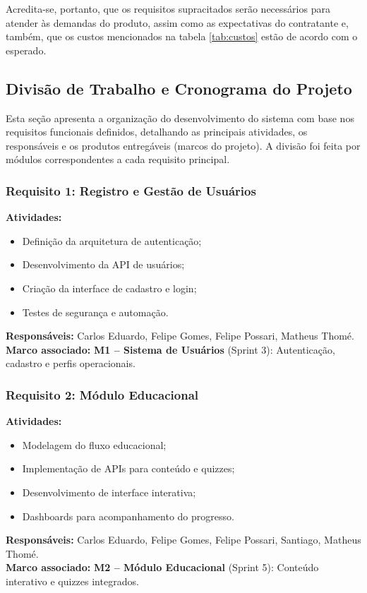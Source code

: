 \documentclass[a5paper, 12pt]{article}
\begin{document}
Acredita-se, portanto, que os requisitos supracitados serão necessários para atender às demandas do produto, assim como as expectativas do contratante e, também, que os custos mencionados na tabela \ref{tab:custos} estão de acordo com o esperado.

\newpage



\subsection{Divisão de Trabalho e Cronograma do Projeto}
\label{sec:trabalho-cronograma}

Esta seção apresenta a organização do desenvolvimento do sistema com base nos requisitos funcionais definidos, detalhando as principais atividades, os responsáveis e os produtos entregáveis (marcos do projeto). A divisão foi feita por módulos correspondentes a cada requisito principal.

\subsubsection*{Requisito 1: Registro e Gestão de Usuários}
\textbf{Atividades:}
\begin{itemize}
  \item Definição da arquitetura de autenticação;
  \item Desenvolvimento da API de usuários;
  \item Criação da interface de cadastro e login;
  \item Testes de segurança e automação.
\end{itemize}
\textbf{Responsáveis:} Carlos Eduardo, Felipe Gomes, Felipe Possari, Matheus Thomé. \\
\textbf{Marco associado:} \textbf{M1 – Sistema de Usuários} (Sprint 3): Autenticação, cadastro e perfis operacionais.

\subsubsection*{Requisito 2: Módulo Educacional}
\textbf{Atividades:}
\begin{itemize}
  \item Modelagem do fluxo educacional;
  \item Implementação de APIs para conteúdo e quizzes;
  \item Desenvolvimento de interface interativa;
  \item Dashboards para acompanhamento do progresso.
\end{itemize}
\textbf{Responsáveis:} Carlos Eduardo, Felipe Gomes, Felipe Possari, Santiago, Matheus Thomé. \\
\textbf{Marco associado:} \textbf{M2 – Módulo Educacional} (Sprint 5): Conteúdo interativo e quizzes integrados.
\end{document}
